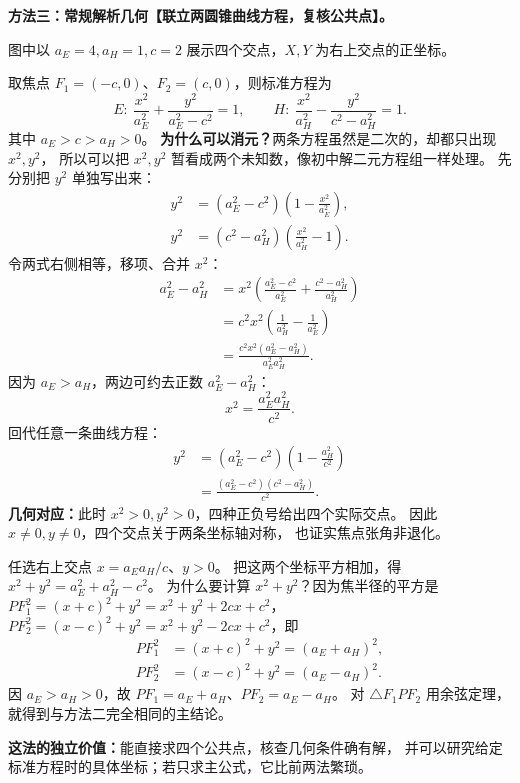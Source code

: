 \clearpage
\begin{proofbox}
\textbf{方法三：常规解析几何【联立两圆锥曲线方程，复核公共点】。}


\begin{center}

\end{center}
图中以 $a_E=4,a_H=1,c=2$ 展示四个交点，$X,Y$ 为右上交点的正坐标。

取焦点 $F_1=(-c,0)$、$F_2=(c,0)$，则标准方程为
\[
 E:\ \frac{x^2}{a_E^2}+\frac{y^2}{a_E^2-c^2}=1,
 \qquad H:\ \frac{x^2}{a_H^2}-\frac{y^2}{c^2-a_H^2}=1.
\]
其中 $a_E>c>a_H>0$。
\textbf{为什么可以消元？}两条方程虽然是二次的，却都只出现 $x^2,y^2$，
所以可以把 $x^2,y^2$ 暂看成两个未知数，像初中解二元方程组一样处理。
先分别把 $y^2$ 单独写出来：
\[
\begin{aligned}
y^2&=(a_E^2-c^2)\left(1-\frac{x^2}{a_E^2}\right),\\
y^2&=(c^2-a_H^2)\left(\frac{x^2}{a_H^2}-1\right).
\end{aligned}
\]
令两式右侧相等，移项、合并 $x^2$：
\[
\begin{aligned}
a_E^2-a_H^2
&=x^2\left(\frac{a_E^2-c^2}{a_E^2}
              +\frac{c^2-a_H^2}{a_H^2}\right)\\
&=c^2x^2\left(\frac1{a_H^2}-\frac1{a_E^2}\right)\\
&=\frac{c^2x^2(a_E^2-a_H^2)}{a_E^2a_H^2}.
\end{aligned}
\]
因为 $a_E>a_H$，两边可约去正数 $a_E^2-a_H^2$：
\[
\boxed{x^2=\frac{a_E^2a_H^2}{c^2}}.
\]
回代任意一条曲线方程：
\[
\begin{aligned}
y^2&=(a_E^2-c^2)\left(1-\frac{a_H^2}{c^2}\right)\\
&=\boxed{\frac{(a_E^2-c^2)(c^2-a_H^2)}{c^2}}.
\end{aligned}
\]
\textbf{几何对应：}此时 $x^2>0,y^2>0$，四种正负号给出四个实际交点。
因此 $x\ne0,y\ne0$，四个交点关于两条坐标轴对称，
也证实焦点张角非退化。

任选右上交点 $x=a_Ea_H/c$、$y>0$。
把这两个坐标平方相加，得 $x^2+y^2=a_E^2+a_H^2-c^2$。
为什么要计算 $x^2+y^2$？因为焦半径的平方是
$PF_1^2=(x+c)^2+y^2=x^2+y^2+2cx+c^2$，
$PF_2^2=(x-c)^2+y^2=x^2+y^2-2cx+c^2$，即
\[
 \begin{aligned}
 PF_1^2&=(x+c)^2+y^2=(a_E+a_H)^2,\\
 PF_2^2&=(x-c)^2+y^2=(a_E-a_H)^2.
 \end{aligned}
\]
因 $a_E>a_H>0$，故 $PF_1=a_E+a_H$、$PF_2=a_E-a_H$。
对 $\triangle F_1PF_2$ 用余弦定理，就得到与方法二完全相同的主结论。

\textbf{这法的独立价值：}能直接求四个公共点，核查几何条件确有解，
并可以研究给定标准方程时的具体坐标；若只求主公式，它比前两法繁琐。
\end{proofbox}

